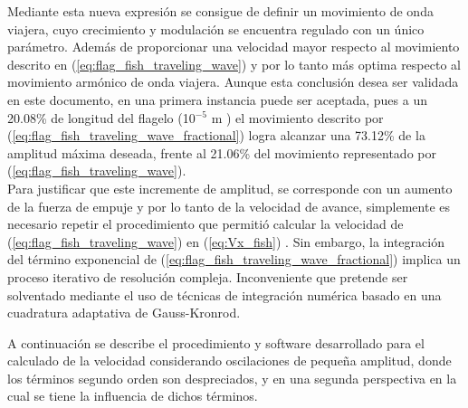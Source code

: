 Mediante esta nueva expresión se consigue de definir un movimiento de onda viajera, cuyo crecimiento y modulación se encuentra regulado con un único parámetro. Además de proporcionar una velocidad mayor respecto al movimiento descrito en (\ref{eq:flag_fish_traveling_wave}) y por lo tanto más optima respecto al movimiento armónico de onda viajera. Aunque esta conclusión desea ser validada en este documento, en una primera instancia puede ser aceptada, pues a un 20.08\% de longitud del flagelo (10$^{-5}$ m ) el movimiento descrito por (\ref{eq:flag_fish_traveling_wave_fractional}) logra alcanzar una 73.12\% de la amplitud máxima deseada, frente al 21.06\% del movimiento representado por (\ref{eq:flag_fish_traveling_wave}).\\

Para justificar que este incremente de amplitud, se corresponde con un aumento de la fuerza de empuje y por lo tanto de la velocidad de avance, simplemente es necesario repetir el procedimiento que permitió calcular la velocidad de (\ref{eq:flag_fish_traveling_wave}) en (\ref{eq:Vx_fish}) \cite{gray1955propulsion}. Sin embargo, la integración del término exponencial de (\ref{eq:flag_fish_traveling_wave_fractional}) implica un proceso iterativo de resolución compleja. Inconveniente que pretende ser solventado mediante el uso de técnicas de integración numérica basado en una cuadratura adaptativa de Gauss-Kronrod.

A continuación se describe el procedimiento y software desarrollado para el calculado de la velocidad considerando oscilaciones de pequeña amplitud, donde los términos segundo orden son despreciados, y en una segunda perspectiva en la cual se tiene la influencia de dichos términos.



